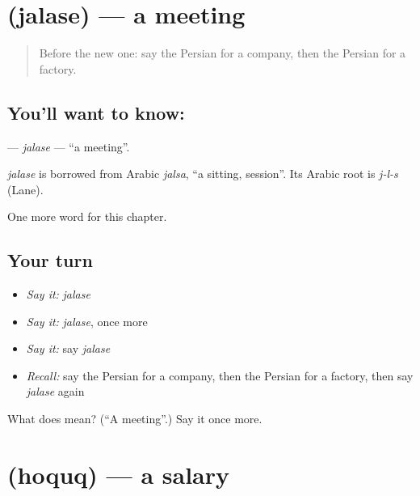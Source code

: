 \section[\texorpdfstring{\fa{جلسه} (jalase)}{جلسه (jalase)}]{ (jalase) — a meeting}

\label{lesson:FA-C176-jalase}



\begin{quote}
Before the new one: say the Persian for a company, then the Persian for a factory.
\end{quote}

\subsection*{You'll want to know: }
\textbf{} — \emph{jalase} — \textquotedblleft{}a meeting\textquotedblright{}.

\begin{cousinweb}
\emph{jalase} is borrowed from Arabic \emph{jalsa}, \textquotedblleft{}a sitting, session\textquotedblright{}. Its Arabic root is \emph{j-l-s} (Lane).
\end{cousinweb}

\begin{grammarlens}[title={What you've built}]
One more word for this chapter.
\end{grammarlens}

\subsection*{Your turn}
\begin{itemize}
\raggedright
  \item \emph{Say it:} \emph{jalase}
  \item \emph{Say it:} \emph{jalase}, once more
  \item \emph{Say it:} say \emph{jalase}
  \item \emph{Recall:} say the Persian for a company, then the Persian for a factory, then say \emph{jalase} again
\end{itemize}

\begin{tcolorbox}[breakable,colback=teal!4,colframe=teal!35!black,title={Before you move on}]
What does  mean? (\textquotedblleft{}A meeting\textquotedblright{}.) Say it once more.
\end{tcolorbox}
\section[\texorpdfstring{\fa{حقوق} (hoquq)}{حقوق (hoquq)}]{ (hoquq) — a salary}

